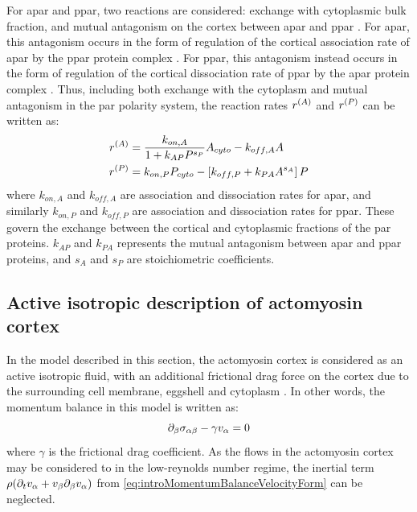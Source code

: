 For \ac{apar} and \ac{ppar}, two reactions are considered: exchange with cytoplasmic bulk fraction, and mutual antagonism on the cortex between \ac{apar} and \ac{ppar} \citep{hoege2013principles}. For \ac{apar}, this antagonism occurs in the form of regulation of the cortical association rate of \ac{apar} by the \ac{ppar} protein complex \citep{robin2014single,sailer2015dynamic}. For \ac{ppar}, this antagonism instead occurs in the form of regulation of the cortical dissociation rate of \ac{ppar} by the \ac{apar} protein complex \citep{goehring2011advectionpolarization}. Thus, including both exchange with the cytoplasm and mutual antagonism in the \ac{par} polarity system, the reaction rates $r^{(A)}$ and $r^{(P)}$ can be written as:
\begin{subequations} \label{eq:parChemicalRateModelPG}
    \begin{align}
        r^{(A)} &= \frac{k_{on,A}}{1 + k_{AP}P^{s_P}}A_{cyto} - k_{off,A}A\\
        r^{(P)} &= k_{on,P}P_{cyto} - \left[k_{off,P} + k_{PA}A^{s_A}\right]P
    \end{align}
\end{subequations}
where $k_{on,A}$ and $k_{off,A}$ are association and dissociation rates for \ac{apar}, and similarly $k_{on,P}$ and $k_{off,P}$ are association and dissociation rates for \ac{ppar}. These govern the exchange between the cortical and cytoplasmic fractions of the \ac{par} proteins. $k_{AP}$ and $k_{PA}$ represents the mutual antagonism between \ac{apar} and \ac{ppar} proteins, and $s_A$ and $s_P$ are stoichiometric coefficients.

\subsection{Active isotropic description of actomyosin cortex}\label{subsec:actomyosinCortexModelPG}
In the model described in this section, the actomyosin cortex is considered as an active isotropic fluid, with an additional frictional drag force on the cortex due to the surrounding cell membrane, eggshell and cytoplasm \citep{mayer2010anisotropies}. In other words, the momentum balance in this model is written as:
\begin{equation}\label{eq:momentumBalanceModelPG}
    \inlinePartial{\beta}{\sigma_{\alpha\beta}} - \gamma v_\alpha = 0
\end{equation}
where $\gamma$ is the frictional drag coefficient. As the flows in the actomyosin cortex may be considered to in the low-reynolds number regime, the inertial term $\rho(\inlinePartial{t}{v_\alpha} + v_\beta\inlinePartial{\beta}{v_\alpha})$ from \autoref{eq:introMomentumBalanceVelocityForm} can be neglected. 

